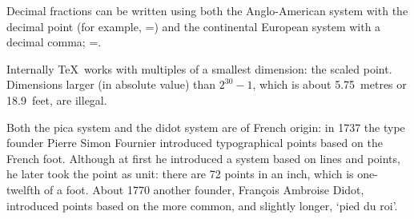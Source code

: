 \documentclass[twoside,letterpaper]{rapport3}
\begin{document}
Decimal fractions can be written using both the
Anglo-American system with the decimal point
(for example, \n{1in}=\n{72.27pt})
and the continental European system with a decimal
comma; \n{1in}=.

Internally \TeX\ works with multiples of a smallest 
dimension: the  scaled point.
Dimensions larger (in absolute value) than $2^{30}-1$,
which is about 5.75~metres or 18.9~feet, are illegal.

Both the pica system and the didot system are of French
origin: in 1737 the type founder Pierre Simon Fournier
introduced typographical points based on the French foot.
Although at first he introduced a system based on lines and
points, he later took the point as unit:
there are 72 points in an inch,
which is one-twelfth of a foot. 
About 1770 another founder, Fran\c{c}ois Ambroise Didot, introduced
points based on the more common, and slightly longer,
`pied du roi'.
\end{document}
